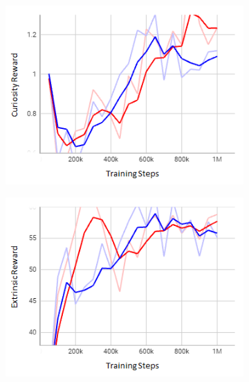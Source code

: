 \documentclass[letterpaper, 10 pt, conference]{ieeeconf}  %
\begin{document}
\begin{figure}[t]
\begin{subfigure}[b]{0.16\linewidth}
         \includegraphics[width=\linewidth]{Fig9c.png}
         \caption{}
         \label{fig9c}
     \end{subfigure}
     \hfill
     \begin{subfigure}[b]{0.16\linewidth}
         \centering
         \includegraphics[width=\linewidth]{Fig9d.png}
         \caption{}
         \label{fig9d}
     \end{subfigure}
     \hfill
     \begin{subfigure}[b]{0.16\linewidth}
         \centering

\end{subfigure}
\end{figure}
\end{document}
